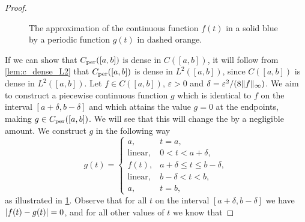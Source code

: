 \documentclass[../thesis.tex]{subfiles}
\begin{document}
\begin{proof}
    \begin{figure}
        \centering
        
        \caption{The approximation of the continuous function $f(t)$ in a solid blue by a periodic function $g(t)$ in dashed orange.}
        \label{fig:g_periodic_close_to_f}
    \end{figure}
    If we can show that $C_{\text{per}}([a,b])$ is dense in $C([a,b])$, it will follow from \cref{lem:c_dense_L2} that $C_{\text{per}}([a,b])$ is dense in $L^2([a,b])$, since $C([a,b])$ is dense in $L^2([a,b])$. Let $f \in C([a,b])$, $\varepsilon>0$ and $\delta = \varepsilon^2/(8\|f\|_\infty)$. We aim to construct a piecewise continuous function $g$ which is identical to $f$ on the interval $[a+\delta,b-\delta ]$ and which attains the value $g = 0$ at the endpoints, making $g\in C_{\text{per}}([a,b])$. We will see that this will change the \Ltwonorm \space by a negligible amount. %
    We construct $g$ in the following way  %
    \begin{equation*} %
        g(t) = 
        \begin{cases} a, &  t=a,\\  
            \text{linear}, &  0<t<a+\delta,\\ 
            f(t), & a+\delta \leq t \leq b-\delta,\\ 
            \text{linear}, &  b-\delta <t<b,\\ 
            a, &  t=b,
        \end{cases}
    \end{equation*} 
    as illustrated in \cref{fig:g_periodic_close_to_f}. Observe that for all $t$ on the interval $[a+\delta, b-\delta]$ we have $|f(t)-g(t)|= 0$, and for all other values of $t$ we know that

\end{proof}
\end{document}
